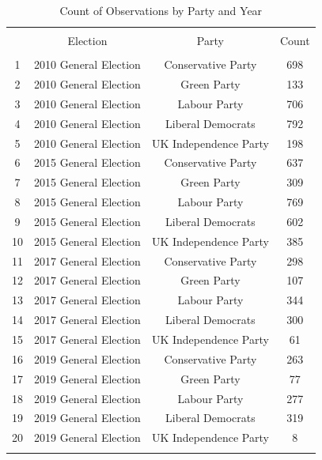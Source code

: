 
\begin{table}[!htbp] \centering 
  \caption{Count of Observations by Party and Year} 
  \label{} 
\begin{tabular}{@{\extracolsep{5pt}} cccc} 
\\[-1.8ex]\hline 
\hline \\[-1.8ex] 
 & Election & Party & Count \\ 
\hline \\[-1.8ex] 
1 &  2010 General Election &  Conservative Party & 698 \\ 
2 &  2010 General Election &  Green Party & 133 \\ 
3 &  2010 General Election &  Labour Party & 706 \\ 
4 &  2010 General Election &  Liberal Democrats & 792 \\ 
5 &  2010 General Election &  UK Independence Party & 198 \\ 
6 &  2015 General Election &  Conservative Party & 637 \\ 
7 &  2015 General Election &  Green Party & 309 \\ 
8 &  2015 General Election &  Labour Party & 769 \\ 
9 &  2015 General Election &  Liberal Democrats & 602 \\ 
10 &  2015 General Election &  UK Independence Party & 385 \\ 
11 &  2017 General Election &  Conservative Party & 298 \\ 
12 &  2017 General Election &  Green Party & 107 \\ 
13 &  2017 General Election &  Labour Party & 344 \\ 
14 &  2017 General Election &  Liberal Democrats & 300 \\ 
15 &  2017 General Election &  UK Independence Party & 61 \\ 
16 &  2019 General Election &  Conservative Party & 263 \\ 
17 &  2019 General Election &  Green Party & 77 \\ 
18 &  2019 General Election &  Labour Party & 277 \\ 
19 &  2019 General Election &  Liberal Democrats & 319 \\ 
20 &  2019 General Election &  UK Independence Party & 8 \\ 
\hline \\[-1.8ex] 
\end{tabular} 
\end{table} 
